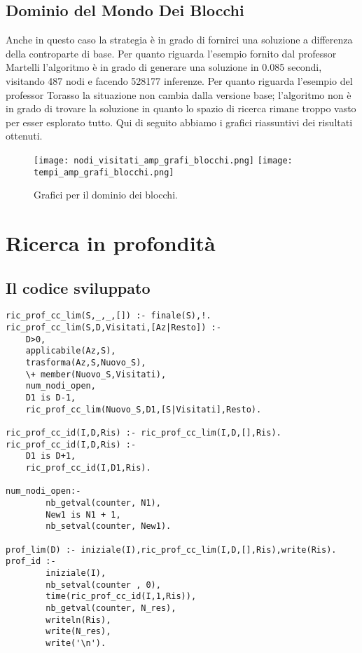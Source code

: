 \subsection{Dominio del Mondo Dei Blocchi}
Anche in questo caso la strategia è in grado di fornirci una soluzione a differenza della controparte di base. Per quanto riguarda l'esempio fornito dal professor Martelli l'algoritmo è in grado di generare una soluzione in 0.085 secondi, visitando 487 nodi e facendo 528177 inferenze. Per quanto riguarda l'esempio del professor Torasso la situazione non cambia dalla versione base; l'algoritmo non è in grado di trovare la soluzione in quanto lo spazio di ricerca rimane troppo vasto per esser esplorato tutto.
Qui di seguito abbiamo i grafici riassuntivi dei risultati ottenuti.
\begin{figure}[h!]
\centering
{\texttt{[image: nodi\_visitati\_amp\_grafi\_blocchi.png]}}\qquad\qquad
{\texttt{[image: tempi\_amp\_grafi\_blocchi.png]}}\qquad\qquad
\caption{Grafici per il dominio dei blocchi.}
\end{figure}


\section{Ricerca in profondità}

\subsection{Il codice sviluppato}

\begin{lstlisting}
ric_prof_cc_lim(S,_,_,[]) :- finale(S),!.
ric_prof_cc_lim(S,D,Visitati,[Az|Resto]) :-
    D>0,
    applicabile(Az,S),
    trasforma(Az,S,Nuovo_S),
    \+ member(Nuovo_S,Visitati),
    num_nodi_open,
    D1 is D-1,
    ric_prof_cc_lim(Nuovo_S,D1,[S|Visitati],Resto).

ric_prof_cc_id(I,D,Ris) :- ric_prof_cc_lim(I,D,[],Ris).
ric_prof_cc_id(I,D,Ris) :-
    D1 is D+1,
    ric_prof_cc_id(I,D1,Ris).

num_nodi_open:-
        nb_getval(counter, N1),
        New1 is N1 + 1,
        nb_setval(counter, New1).

prof_lim(D) :- iniziale(I),ric_prof_cc_lim(I,D,[],Ris),write(Ris).
prof_id :-
        iniziale(I),
        nb_setval(counter , 0),
        time(ric_prof_cc_id(I,1,Ris)),
        nb_getval(counter, N_res),
        writeln(Ris),
        write(N_res),
        write('\n').
\end{lstlisting}


